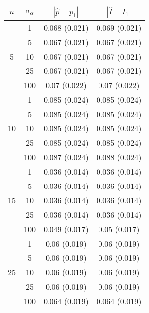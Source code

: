 \documentclass{article}
\begin{document}
\begin{table}[ht]
\centering
\begin{tabular}{cccc}
  \hline
 $n$ & $\sigma_\alpha$ & $|\hat p - p_1|$ & $|\hat I - I_1|$ \\ 
  \hline
   &   1 & 0.068 (0.021) & 0.069 (0.021) \\ 
   &   5 & 0.067 (0.021) & 0.067 (0.021) \\ 
 5 &  10 & 0.067 (0.021) & 0.067 (0.021) \\ 
   &  25 & 0.067 (0.021) & 0.067 (0.021) \\ 
   & 100 & 0.07 (0.022) & 0.07 (0.022) \\ 
   &   1 & 0.085 (0.024) & 0.085 (0.024) \\ 
   &   5 & 0.085 (0.024) & 0.085 (0.024) \\ 
10 &  10 & 0.085 (0.024) & 0.085 (0.024) \\ 
   &  25 & 0.085 (0.024) & 0.085 (0.024) \\ 
   & 100 & 0.087 (0.024) & 0.088 (0.024) \\ 
   &   1 & 0.036 (0.014) & 0.036 (0.014) \\ 
   &   5 & 0.036 (0.014) & 0.036 (0.014) \\ 
15 &  10 & 0.036 (0.014) & 0.036 (0.014) \\ 
   &  25 & 0.036 (0.014) & 0.036 (0.014) \\ 
   & 100 & 0.049 (0.017) & 0.05 (0.017) \\ 
   &   1 & 0.06 (0.019) & 0.06 (0.019) \\ 
   &   5 & 0.06 (0.019) & 0.06 (0.019) \\ 
25 &  10 & 0.06 (0.019) & 0.06 (0.019) \\ 
   &  25 & 0.06 (0.019) & 0.06 (0.019) \\ 
   & 100 & 0.064 (0.019) & 0.064 (0.019) \\ 
   \hline
\end{tabular}
\end{table}

	
\end{document}
